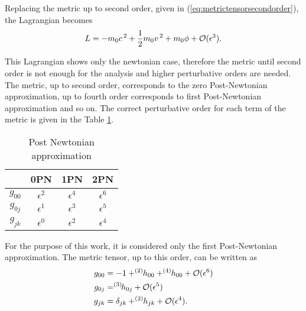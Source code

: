Replacing the metric up to second order, given in (\ref{eq:metrictensorsecondorder}), the Lagrangian becomes
\begin{equation}
 L = -m_0c^{\hspace{0.05cm}2} +\frac{1}{2}m_0v^{\hspace{0.05cm}2}+m_0\phi + \mathcal{O}(\epsilon^{3}).
\end{equation}

This Lagrangian shows only the newtonian case, therefore the metric until second order is not enough for the analysis and higher perturbative orders are needed. The metric, up to second order, corresponds to the zero Post-Newtonian approximation, up to fourth order corresponds to first Post-Newtonian approximation and so on. The correct perturbative order for each term of the metric is given in the Table \ref{tab:tablePNorders}.\\
\begin{table}[htbp]
\centering
\begin{tabular}{c|ccc}
\centering
 & 0PN  & 1PN  &2PN  \\ \hline
 $g_{00}$&  $\epsilon^2$& $\epsilon^4$ & $\epsilon^6$ \\
 $g_{0j}$& $\epsilon^1$&$\epsilon^3$  &$\epsilon^5$    \\
 $g_{jk}$&$\epsilon^0 $ &  $\epsilon^2$&  $\epsilon^4$
\end{tabular}
  \caption{Post Newtonian approximation}
 \label{tab:tablePNorders}
\end{table}


For the purpose of this work, it is considered only the first Post-Newtonian approximation. The metric tensor, up to this order, can be written as
\begin{subequations}
\begin{align}
\label{eq:g00approx}
 g_{00} &= -1+ ^{(2)}\hspace{-0.1cm}h_{00}+ ^{(4)}\hspace{-0.1cm}h_{00}+\mathcal{O}(\epsilon^6)\\
 \label{eq:g0japprox}
 g_{0j} &= \hspace{-0.1cm}^{(3)}\hspace{-0.05cm}h_{0j}+ \mathcal{O}(\epsilon^5) \\
 \label{eq:gijapprox}
  g_{jk} &= \delta_{jk}+^{(2)}\hspace{-0.1cm}h_{jk}+\mathcal{O}(\epsilon^4).
\end{align}
\end{subequations}


